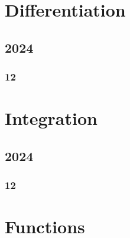 \documentclass[11pt]{book}
\begin{document}
\chapter{Differentiation}
\section{2024}
\subsection{12}


%






\chapter{Integration}
\section{2024}
\subsection{12}

%


\chapter{Functions}
%
\end{document}
